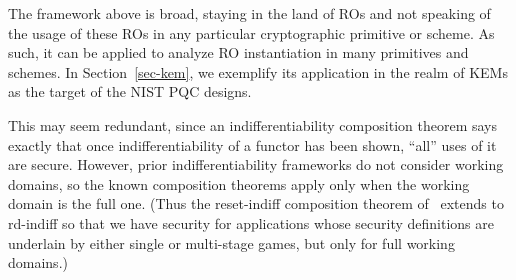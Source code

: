  





 



 The framework above is broad, staying in the land of ROs and not speaking of the usage of these ROs in any particular cryptographic primitive or scheme. As such, it can be applied to analyze RO instantiation in many primitives and schemes. In Section~\ref{sec-kem}, we exemplify its application in the realm of KEMs as the target of the NIST PQC designs.

This may seem redundant, since an indifferentiability composition theorem says exactly that once indifferentiability of a functor has been shown, ``all'' uses of it are secure. However, prior indifferentiability frameworks do not consider working domains, so the known composition theorems apply only when the working domain is the full one. (Thus the reset-indiff composition theorem of~\cite{EC:RisShaShr11} extends to rd-indiff so that we have security for applications whose security definitions are underlain by either single or multi-stage games, but only for full working domains.) 

